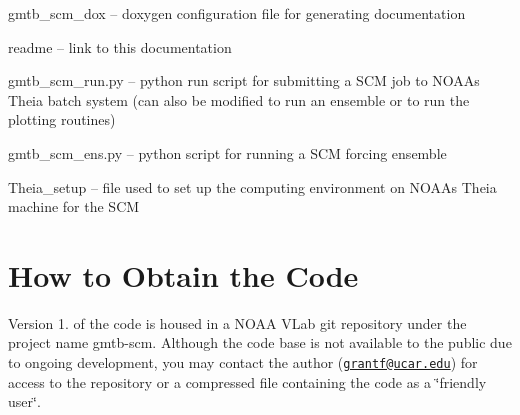 \begin{DoxyItemize}
\item gmtb\+\_\+scm\+\_\+dox -- doxygen configuration file for generating documentation
\item readme -- link to this documentation
\item gmtb\+\_\+scm\+\_\+run.\+py -- python run script for submitting a S\+CM job to N\+O\+AA\textquotesingle{}s Theia batch system (can also be modified to run an ensemble or to run the plotting routines)
\item gmtb\+\_\+scm\+\_\+ens.\+py -- python script for running a S\+CM forcing ensemble
\item Theia\+\_\+setup -- file used to set up the computing environment on N\+O\+AA\textquotesingle{}s Theia machine for the S\+CM
\end{DoxyItemize}\hypertarget{index_obtain}{}\section{How to Obtain the Code}\label{index_obtain}
Version 1. of the code is housed in a N\+O\+AA V\+Lab git repository under the project name gmtb-\/scm. Although the code base is not available to the public due to ongoing development, you may contact the author (\href{mailto:grantf@ucar.edu}{\tt grantf@ucar.\+edu}) for access to the repository or a compressed file containing the code as a \char`\"{}friendly user\char`\"{}.

